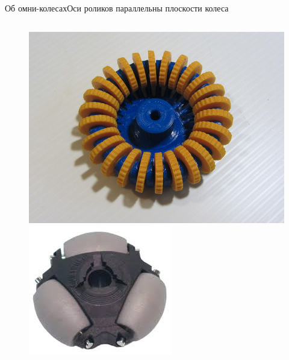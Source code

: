 
\begin{frame}{Об омни-колесах}{Оси роликов параллельны плоскости колеса}
    \vspace{-5pt}
    \begin{figure}[H]
        \centering
        \begin{columns}
                \centering
                \includegraphics[width=\linewidth]{content/pic/photo/wheel_rings.jpg}
                \centering
                \includegraphics[width=\linewidth]{content/pic/photo/wheel_big_rollers.jpeg}

\end{columns}
\end{figure}
\end{frame}
